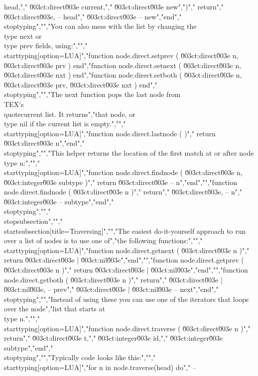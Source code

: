 head,","    \u003ct:direct\u003e current,","    \u003ct:direct\u003e new",")","    return","        \u003ct:direct\u003e, -- head","        \u003ct:direct\u003e  -- new","end","\\stoptyping","","You can also mess with the list by changing the \\type {next} or \\type {prev} fields, using:","","\\starttyping[option=LUA]","function node.direct.setprev ( \u003ct:direct\u003e n, \u003ct:direct\u003e prv                 ) end","function node.direct.setnext ( \u003ct:direct\u003e n, \u003ct:direct\u003e nxt                 ) end","function node.direct.setboth ( \u003ct:direct\u003e n, \u003ct:direct\u003e prv, \u003ct:direct\u003e nxt ) end","\\stoptyping","","The next function pops the last node from \\TEX's \\quote{current list}. It returns","that node, or \\type {nil} if the current list is empty.","","\\starttyping[option=LUA]","function node.direct.lastnode ( )","    return \u003ct:direct\u003e n","end","\\stoptyping","","This helper returns the location of the first match at or after node \\type {n}:","","\\starttyping[option=LUA]","function node.direct.findnode ( \u003ct:direct\u003e n, \u003ct:integer\u003e subtype )","    return \u003ct:direct\u003e -- n","end","","function node.direct.findnode ( \u003ct:direct\u003e n )","    return","        \u003ct:direct\u003e, -- n","        \u003ct:integer\u003e -- subtype","end","\\stoptyping","","\\stopsubsection","","\\startsubsection[title={Traversing}]","","The easiest do-it-yourself approach to run over a list of nodes is to use one of","the following functions:","","\\starttyping[option=LUA]","function node.direct.getnext ( \u003ct:direct\u003e n )","    return \u003ct:direct\u003e | \u003ct:nil\u003e","end","","function node.direct.getprev ( \u003ct:direct\u003e n )","    return \u003ct:direct\u003e | \u003ct:nil\u003e","end","","function node.direct.getboth ( \u003ct:direct\u003e n )","    return","        \u003ct:direct\u003e | \u003ct:nil\u003e, -- prev","        \u003ct:direct\u003e | \u003ct:nil\u003e  -- next","end","\\stoptyping","","Instead of using these you can use one of the iterators that loops over the node","list that starts at \\type {n}.","","\\starttyping[option=LUA]","function node.direct.traverse ( \u003ct:direct\u003e n )","    return","        \u003ct:direct\u003e  t,","        \u003ct:integer\u003e id,","        \u003ct:integer\u003e subtype","end","\\stoptyping","","Typically code looks like this:","","\\starttyping[option=LUA]","for n in node.traverse(head) do","    -- 